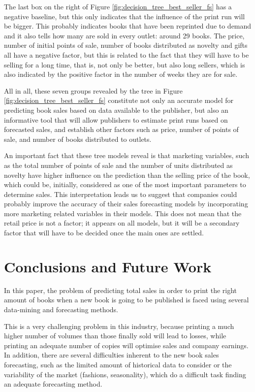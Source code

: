 \documentclass[a4paper,10pt,twocolumn,preprint,3p]{elsarticle}
\begin{document}
The last box on the right of Figure
\ref{fig:decision_tree_best_seller_fs} has a negative baseline, but
this only indicates that the influence of the print run will be
bigger. This probably indicates books that have been reprinted due to
demand and it also tells how many are sold in every outlet: around 29
books. The price, number of initial points of sale, number of books
distributed as novelty and gifts all have a negative factor, but this
is related to the fact that they will have to be selling for a long
time, that is, not only be better, but also long sellers, which is also
indicated by the positive factor in the number of weeks they are for
sale. 

All in all, these seven groups revealed by the tree in Figure
\ref{fig:decision_tree_best_seller_fs} constitute not only an accurate
model for predicting book sales based on data available to the
publisher, but also an informative tool that will allow publishers to
estimate print runs based on forecasted sales, and establish other
factors such as price, number of points of sale, and number of books
distributed to outlets. 

An important fact that these tree models reveal is that marketing
variables, such as the total number of points of sale and the number
of units distributed as novelty have higher influence on the
prediction than the selling price of the book, which could be,
initially, considered as one of the most important parameters to
determine sales. This interpretation leads us to suggest that
companies could probably improve the accuracy of their sales
forecasting models by incorporating more marketing related variables
in their models. This does not mean that the retail price is not a
factor; it appears on all models, but it will be a secondary factor
that will have to be decided once the main ones are settled. 


\section{Conclusions and Future Work}
\label{sec:conclusionsAndFutureWork}

In this paper, the problem of 
predicting total sales in order to print the right amount of books
when a new book is going to be published is faced using several data-mining 
and forecasting methods.

This is a very challenging problem in this industry, because printing
a much higher 
number of volumes than those finally sold will lead to losses, while
printing an adequate number of copies will optimise sales and company
earnings.  
In addition, there are several difficulties inherent to the new book
sales forecasting, such as the limited amount of historical data to
consider or the variability of the market (fashions, seasonality),
which do a difficult task finding an adequate forecasting method. 
\end{document}
